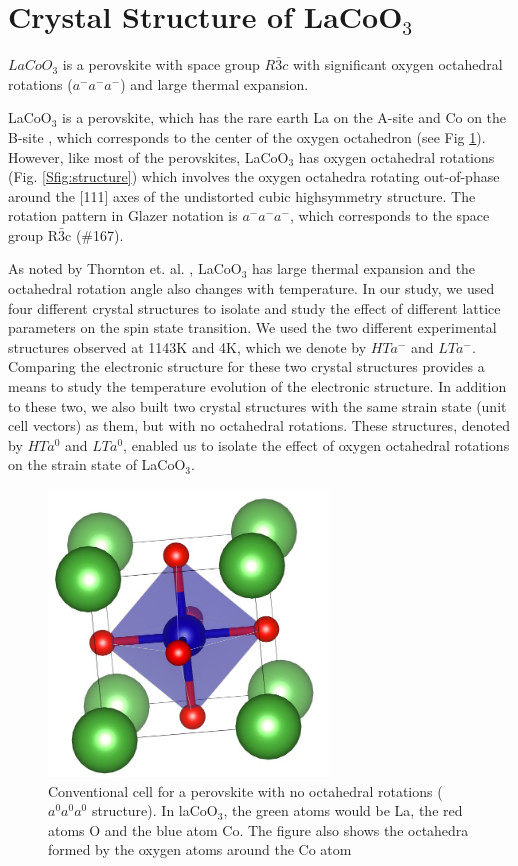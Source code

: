 \documentclass[10pt]{ruthesis}
\begin{document}
{\section{Crystal Structure of LaCoO$_3$}$LaCoO_3$ is a perovskite with space group $R\bar{3}c$ with significant oxygen octahedral rotations ($a^-a^-a^-$) and large thermal expansion. 

LaCoO$_3$ is a perovskite, which has the rare earth La on the A-site and Co on the B-site   , which corresponds to the center of the oxygen octahedron (see Fig \ref{Perov_struct}). However, like most of the perovskites, LaCoO$_3$ has oxygen octahedral rotations (Fig. \ref{Sfig:structure}) which involves the oxygen octahedra rotating out-of-phase around the [111] axes of the undistorted cubic highsymmetry structure. The rotation pattern in Glazer notation is $a^-a^-a^-$, which corresponds to the space group R$\bar 3$c (\#167).

As noted by Thornton et. al. \cite{Thornton}, LaCoO$_3$ has large thermal expansion and the octahedral rotation angle also changes with temperature. In our study, we used four different crystal structures to isolate and study the effect of different lattice parameters on the spin state transition. We used the two different experimental structures observed at 1143K and 4K, which we denote by $HTa^-$ and $LTa^-$. Comparing the electronic structure for these two crystal structures provides a means to study the temperature evolution of the electronic structure. In addition to these two, we also built two crystal structures with the same strain state (unit cell vectors) as them, but with no octahedral rotations. These structures, denoted by $HTa^0$ and $LTa^0$, enabled us to isolate the effect of oxygen octahedral rotations on the strain state of LaCoO$_3$. 

\begin{figure}\label{Perov_struct}
 \begin{center}
 \includegraphics[height=3in]{plots_final/supplement_plots/perovskite_struct}
 \caption{Conventional cell for a perovskite with no octahedral rotations ($a^0a^0a^0$ structure). In laCoO$_3$, the green atoms would be 
La, the red atoms O and the blue atom Co. The figure also shows the octahedra formed by the oxygen atoms around the Co atom}
\end{center}
\end{figure}

}
\end{document}
